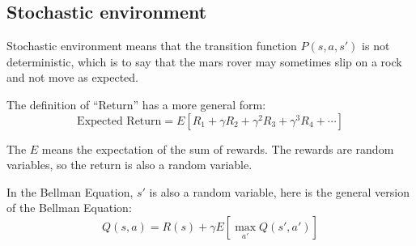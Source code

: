 \subsection*{Stochastic environment}
Stochastic environment means that the transition function $P(s, a, s')$ is not deterministic, which is to say that
the mars rover may sometimes slip on a rock and not move as expected. 

The definition of ``Return'' has a more general form:
\begin{equation}
    \text{Expected Return} = E\left[R_1 + \gamma R_2 + \gamma^2 R_3 + \gamma^3 R_4 + \cdots \right]
\end{equation}

The $E$ means the expectation of the sum of rewards. The rewards are random variables, so the return is also a random variable.

In the Bellman Equation, $s'$ is also a random variable, here is the general version of the Bellman Equation:
\begin{equation}
    Q(s, a) = R(s) + \gamma E\left[\max \limits_{a'} Q(s', a')\right]
\end{equation}
